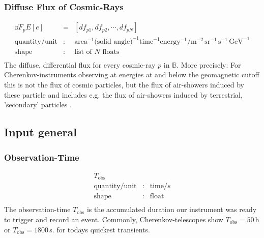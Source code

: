 \documentclass{article}%
\begin{document}
            \subsubsection*{Diffuse Flux of Cosmic-Rays}
                \begin{eqnarray*}
                    \dd{F_p}{E}[e] &=& [df_{p1}, df_{p2}, \cdots, df_{pN}]\\
                    \text{quantity}/\text{unit} &:& \text{area}^{-1} \text{(solid angle)}^{-1} \text{time}^{-1} \text{energy}^{-1} / \text{m}^{-2}\, \text{sr}^{-1}\,\text{s}^{-1}\,\text{GeV}^{-1}\\
                    \text{shape} &:& \text{list of}\,\,N\,\,\text{floats}\\
                \end{eqnarray*}
                The diffuse, differential flux for every cosmic-ray $p$ in $\mathbb{B}$.
                More precisely: For Cherenkov-instruments observing at energies at and below the geomagnetic cutoff this is not the flux of cosmic particles, but the flux of air-showers induced by these particle and includes e.g. the flux of air-showers induced by terrestrial, 'secondary' particles \cite{lipari2002fluxes}.
        \subsection{Input general}
            \subsubsection*{Observation-Time}
                \begin{eqnarray*}
                    T_\text{obs} && \\
                    \text{quantity}/\text{unit} &:& \text{time} / s\\
                    \text{shape} &:& \text{float}\\
                \end{eqnarray*}
                The observation-time $T_\text{obs}$ is the accumulated duration our instrument was ready to trigger and record an event.
                Commonly, Cherenkov-telescopes show $T_\text{obs} = 50\,$h or $T_\text{obs} = 1800\,$s. for todays quickest transients.
\end{document}
